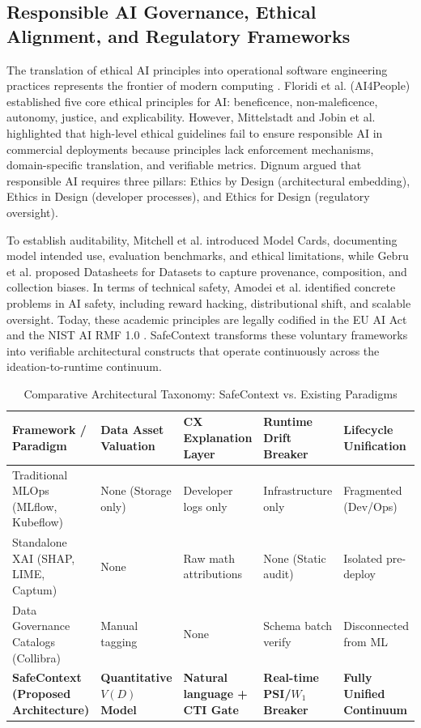 \documentclass[journal]{IEEEtran}
\begin{document}
\subsection{Responsible AI Governance, Ethical Alignment, and Regulatory Frameworks}
The translation of ethical AI principles into operational software engineering practices represents the frontier of modern computing \cite{floridi2018ai4people, mittelstadt2019principles, dignum2019responsible}. Floridi et al. \cite{floridi2018ai4people} (AI4People) established five core ethical principles for AI: beneficence, non-maleficence, autonomy, justice, and explicability. However, Mittelstadt \cite{mittelstadt2019principles} and Jobin et al. \cite{jobin2019global} highlighted that high-level ethical guidelines fail to ensure responsible AI in commercial deployments because principles lack enforcement mechanisms, domain-specific translation, and verifiable metrics. Dignum \cite{dignum2019responsible} argued that responsible AI requires three pillars: Ethics by Design (architectural embedding), Ethics in Design (developer processes), and Ethics for Design (regulatory oversight).

To establish auditability, Mitchell et al. \cite{mitchell2019model} introduced Model Cards, documenting model intended use, evaluation benchmarks, and ethical limitations, while Gebru et al. \cite{gebru2021datasheets} proposed Datasheets for Datasets to capture provenance, composition, and collection biases. In terms of technical safety, Amodei et al. \cite{amodei2016concrete} identified concrete problems in AI safety, including reward hacking, distributional shift, and scalable oversight. Today, these academic principles are legally codified in the EU AI Act \cite{eu_ai_act2024} and the NIST AI RMF 1.0 \cite{nist_ai_rmf2023}. SafeContext transforms these voluntary frameworks into verifiable architectural constructs that operate continuously across the ideation-to-runtime continuum.

\begin{table}[t]
\caption{Comparative Architectural Taxonomy: SafeContext vs. Existing Paradigms}
\label{tab:comparative_taxonomy}
\centering
\small
\begin{tabular}{p{4.2cm}p{3.0cm}p{3.5cm}p{3.2cm}p{2.6cm}}
\toprule
\textbf{Framework / Paradigm} & \textbf{Data Asset Valuation} & \textbf{CX Explanation Layer} & \textbf{Runtime Drift Breaker} & \textbf{Lifecycle Unification} \\
\midrule
Traditional MLOps (MLflow, Kubeflow) & None (Storage only) & Developer logs only & Infrastructure only & Fragmented (Dev/Ops) \\
Standalone XAI (SHAP, LIME, Captum) & None & Raw math attributions & None (Static audit) & Isolated pre-deploy \\
Data Governance Catalogs (Collibra) & Manual tagging & None & Schema batch verify & Disconnected from ML \\
\textbf{SafeContext (Proposed Architecture)} & \textbf{Quantitative $V(D)$ Model} & \textbf{Natural language + CTI Gate} & \textbf{Real-time PSI/$W_1$ Breaker} & \textbf{Fully Unified Continuum} \\
\bottomrule
\end{tabular}
\end{table}
\end{document}

